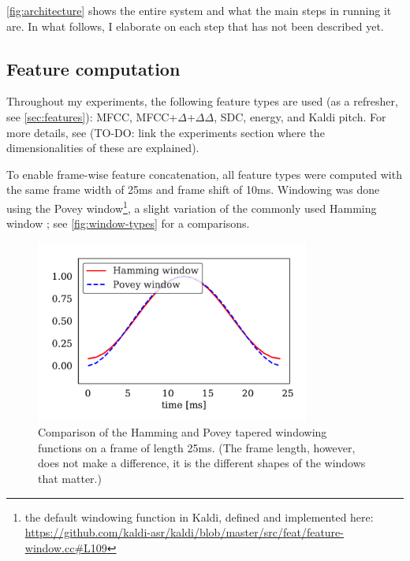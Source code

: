 \documentclass[bsc,frontabs,twoside,singlespacing,parskip,deptreport]{infthesis}
\begin{document}
{{    %

    \autoref{fig:architecture} shows the entire system and what the main steps in running it are. In what follows, I elaborate on each step that has not been described yet.

    \subsection{Feature computation}{
      \label{sec:feature-computation}
      Throughout my experiments, the following feature types are used (as a refresher, see \autoref{sec:features}): MFCC, MFCC+$\Delta$+$\Delta\Delta$, SDC, energy, and Kaldi pitch. For more details, see (TO-DO: link the experiments section where the dimensionalities of these are explained).

      To enable frame-wise feature concatenation, all feature types were computed with the same frame width of 25ms and frame shift of 10ms. Windowing was done using the Povey window\footnote{the default windowing function in Kaldi, defined and implemented here: \url{https://github.com/kaldi-asr/kaldi/blob/master/src/feat/feature-window.cc\#L109}}, a slight variation of the commonly used Hamming window \citep[p. 200]{Blackman_Tukey_1958}; see \autoref{fig:window-types} for a comparisons.
      \begin{figure}[h!t]
        \centering
        \includegraphics[width=9cm]{../img/window-types.pdf}
        \vspace*{-1em}
        \caption{Comparison of the Hamming and Povey tapered windowing functions on a frame of length 25ms. (The frame length, however, does not make a difference, it is the different shapes of the windows that matter.)}
        \label{fig:window-types}
      \end{figure}

}}}
\end{document}
